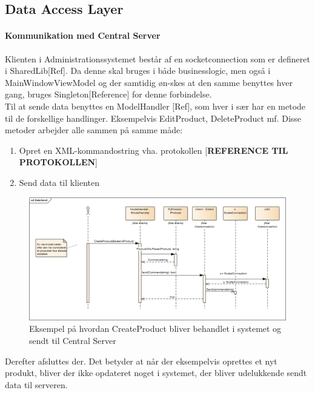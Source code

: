\subsection{Data Access Layer}
\paragraph*{Kommunikation med Central Server}
Klienten i Administrationssystemet består af en socketconnection som er defineret i SharedLib[Ref]. Da denne skal bruges i både businesslogic, men også i MainWindowViewModel og der samtidig øn-skes at den samme benyttes hver gang, bruges Singleton[Reference] for denne forbindelse. \\
Til at sende data benyttes en ModelHandler [Ref], som hver i sær har en metode til de forskellige handlinger. Eksempelvis EditProduct, DeleteProduct mf. Disse metoder arbejder alle sammen på samme måde:
\begin{enumerate}
\item Opret en XML-kommandostring vha. protokollen [\textbf{REFERENCE TIL PROTOKOLLEN}]
\item Send data til klienten
\end{enumerate}


\begin{figure}[!h]
    \centering
    \includegraphics[width=1\textwidth]{Systemdesign/backend/Images/DataSend.png}
    \caption{Eksempel på hvordan CreateProduct bliver behandlet i systemet og sendt til Central Server}
    \label{fig:CreateSend}
\end{figure}

Derefter afsluttes der. Det betyder at når der eksempelvis oprettes et nyt produkt, bliver der ikke opdateret noget i systemet, der bliver udelukkende sendt data til serveren.\\\\


